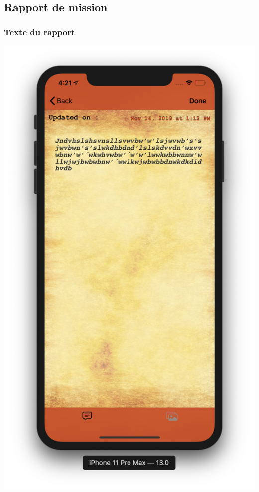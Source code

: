 \documentclass{article}
\begin{document}
\newpage


\subsection{Rapport de mission}

\subsubsection{Texte du rapport}

\begin{center}
  \includegraphics[scale=0.2]{TextRapportIOS.png}

\end{center}
\end{document}
